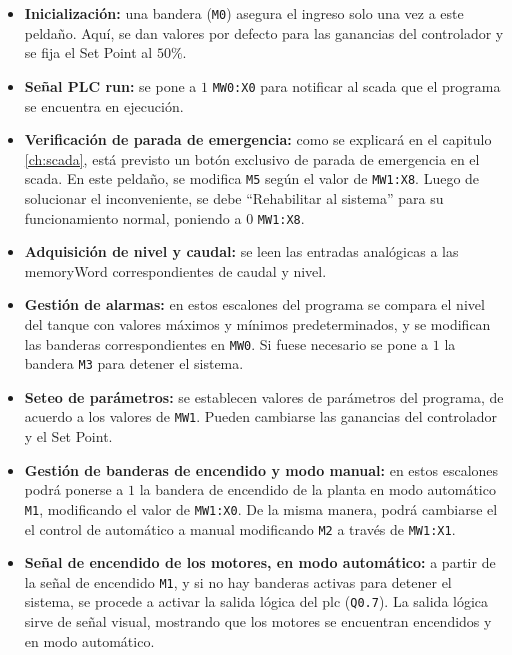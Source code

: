 \begin{itemize}
 \item \textbf{Inicialización:} una bandera (\verb|M0|) asegura el ingreso solo
una vez a este peldaño. Aquí, se dan valores por defecto para las
ganancias del controlador y se fija el Set Point al $50\%$.

 \item \textbf{Señal PLC run:} se pone a $1$ \verb|MW0:X0| para notificar al
 \gls{scada} que el programa se encuentra en ejecución.

 \item \textbf{Verificación de parada de emergencia:}
  como se explicará en el capitulo \ref{ch:scada}, está previsto un
 botón exclusivo de parada de emergencia en el \gls{scada}.
 En este peldaño, se modifica \verb|M5| según el valor de \verb|MW1:X8|.
 Luego de solucionar el inconveniente,
 se debe ``Rehabilitar al sistema'' para su funcionamiento normal, poniendo a
 $0$ \verb|MW1:X8|.

 \item \textbf{Adquisición de nivel y caudal:} se leen las entradas analógicas
 a las \gls{memoryWord} correspondientes de caudal y nivel.

 \item \textbf{Gestión de alarmas:} en estos escalones del programa se compara
el nivel del tanque con valores máximos y mínimos predeterminados, y se
modifican las banderas correspondientes en \verb|MW0|. Si fuese necesario se
pone a $1$ la bandera \verb|M3| para detener el sistema.

  \item \textbf{Seteo de parámetros:}
  se establecen valores de parámetros del programa, de acuerdo
a los valores de \verb|MW1|.
Pueden cambiarse las ganancias del controlador y el Set Point.

  \item \textbf{Gestión de banderas de encendido y modo manual:} en estos
  escalones podrá ponerse a $1$ la
  bandera de encendido de la planta en modo automático \verb|M1|, modificando
el valor de \verb|MW1:X0|.
  De la misma manera, podrá cambiarse el
  el control de automático a manual modificando \verb|M2| a través de
  \verb|MW1:X1|.

  \item \textbf{Señal de encendido de los motores, en modo automático:} a
  partir de la señal de encendido \verb|M1|, y si no hay banderas activas para 
detener el sistema, se
  procede a activar la salida lógica del  \gls{plc} (\verb|Q0.7|).
  La salida lógica sirve de señal visual, mostrando que los motores se
encuentran encendidos y en modo automático.


\end{itemize}

